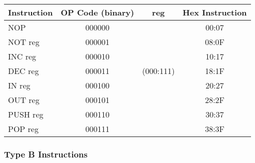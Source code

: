 \documentclass[a4paper, 11pt]{report}
\begin{document}
\begin{center}

    \begin{tabular}{|l|c|c|c|}
        \hline
        \textbf{Instruction} & \textbf{OP Code (binary)} & \textbf{reg} & \textbf{Hex Instruction} \\
        \hline
        NOP                  & 000000                    &              & 00:07                    \\
        \cline{1-2}
        \cline{4-4}
        NOT reg              & 000001                    &              & 08:0F                    \\
        \cline{1-2}
        \cline{4-4}
        INC reg              & 000010                    &              & 10:17                    \\
        \cline{1-2}
        \cline{4-4}
        DEC reg              & 000011                    & (000:111)    & 18:1F                    \\
        \cline{1-2}
        \cline{4-4}
        IN reg               & 000100                    &              & 20:27                    \\
        \cline{1-2}
        \cline{4-4}
        OUT reg              & 000101                    &              & 28:2F                    \\
        \cline{1-2}
        \cline{4-4}
        PUSH reg             & 000110                    &              & 30:37                    \\
        \cline{1-2}
        \cline{4-4}
        POP reg              & 000111                    &              & 38:3F                    \\
        \hline
    \end{tabular}
\end{center}

\subsubsection{Type B Instructions}
\end{document}
